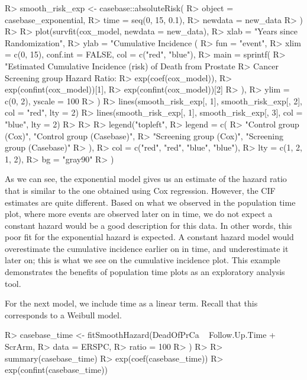 \documentclass[
]{jss}
\begin{document}
\begin{CodeChunk}

\begin{CodeInput}
R> smooth_risk_exp <- casebase::absoluteRisk(
R>   object = casebase_exponential,
R>   time = seq(0, 15, 0.1),
R>   newdata = new_data
R> )
R> 
R> plot(survfit(cox_model, newdata = new_data),
R>   xlab = "Years since Randomization",
R>   ylab = "Cumulative Incidence (%
R>   fun = "event",
R>   xlim = c(0, 15), conf.int = FALSE, col = c("red", "blue"),
R>   main = sprintf(
R>     "Estimated Cumulative Incidence (risk) of Death from Prostate 
R>                     Cancer Screening group Hazard Ratio: %
R>     exp(coef(cox_model)),
R>     exp(confint(cox_model))[1],
R>     exp(confint(cox_model))[2]
R>   ),
R>   ylim = c(0, 2), yscale = 100
R> )
R> lines(smooth_risk_exp[, 1], smooth_risk_exp[, 2], col = "red", lty = 2)
R> lines(smooth_risk_exp[, 1], smooth_risk_exp[, 3], col = "blue", lty = 2)
R> 
R> 
R> legend("topleft",
R>   legend = c(
R>     "Control group (Cox)", "Control group (Casebase)",
R>     "Screening group (Cox)", "Screening group (Casebase)"
R>   ),
R>   col = c("red", "red", "blue", "blue"),
R>   lty = c(1, 2, 1, 2),
R>   bg = "gray90"
R> )
\end{CodeInput}
\end{CodeChunk}

As we can see, the exponential model gives us an estimate of the hazard
ratio that is similar to the one obtained using Cox regression. However,
the CIF estimates are quite different. Based on what we observed in the
population time plot, where more events are observed later on in time,
we do not expect a constant hazard would be a good description for this
data. In other words, this poor fit for the exponential hazard is
expected. A constant hazard model would overestimate the cumulative
incidence earlier on in time, and underestimate it later on; this is
what we see on the cumulative incidence plot. This example demonstrates
the benefits of population time plots as an exploratory analysis tool.

For the next model, we include time as a linear term. Recall that this
corresponds to a Weibull model.

\begin{CodeChunk}

\begin{CodeInput}
R> casebase_time <- fitSmoothHazard(DeadOfPrCa ~ Follow.Up.Time + ScrArm,
R>   data = ERSPC,
R>   ratio = 100
R> )
R> 
R> summary(casebase_time)
R> exp(coef(casebase_time))
R> exp(confint(casebase_time))
\end{CodeInput}
\end{CodeChunk}
\end{document}
